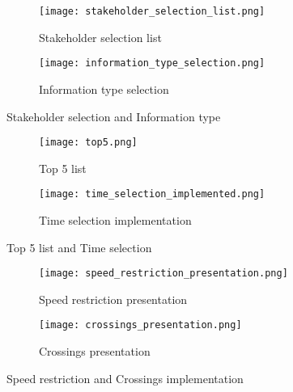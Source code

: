 \begin{figure}[h!tbp]
	\centering
	\begin{subfigure}{0.4\textwidth}
		\texttt{[image: stakeholder\_selection\_list.png]}
		\caption[Stakeholder selection list]{Stakeholder selection list}
		\label{fig:stakeholder_selection_list}
	\end{subfigure}
	\begin{subfigure}{0.3\textwidth}
		\texttt{[image: information\_type\_selection.png]}
		\caption[Information type selection]{Information type selection}
		\label{fig:implementation_type_selection}
	\end{subfigure}
	\caption[Stakeholder selection and Information type]{Stakeholder selection and Information type}
	\label{fig:stakeholder_selection_and_information_type}
\end{figure}

\begin{figure}[h!tbp]
	\centering
	\begin{subfigure}{0.4\textwidth}
		\texttt{[image: top5.png]}
		\caption[Top 5 list]{Top 5 list}
		\label{fig:top_5_list}
	\end{subfigure}
	\begin{subfigure}{0.6\textwidth}
		\texttt{[image: time\_selection\_implemented.png]}
		\caption[Time selection implementation]{Time selection implementation}
		\label{fig:time_selection_implemented}
	\end{subfigure}
	\caption[Top 5 list and Time selection]{Top 5 list and Time selection}
	\label{fig:Top5_list_and_time_selection}
\end{figure}

\begin{figure}[h!tbp]
	\centering
	\begin{subfigure}{0.6\textwidth}
		\texttt{[image: speed\_restriction\_presentation.png]}
		\caption[Speed restriction presentation]{Speed restriction presentation}
		\label{fig:speed_restriction_presentation}
	\end{subfigure}
	\begin{subfigure}{0.25\textwidth}
		\texttt{[image: crossings\_presentation.png]}
		\caption[Crossings presentation]{Crossings presentation}
		\label{fig:crossings_presentation}
	\end{subfigure}
	\caption[Speed restriction and Crossings implementation]{Speed restriction and Crossings implementation}
	\label{fig:crossings_and_speed_restriction_implementation}
\end{figure}

